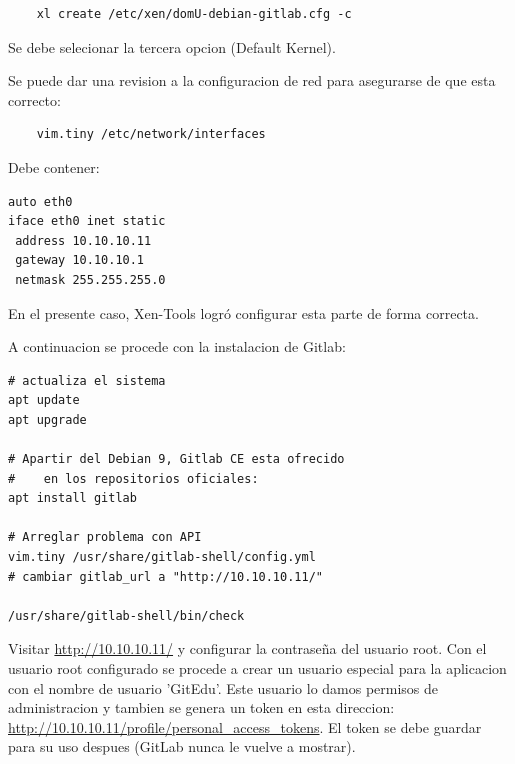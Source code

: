 \begin{lstlisting}
	xl create /etc/xen/domU-debian-gitlab.cfg -c
\end{lstlisting}

Se debe selecionar la tercera opcion (Default Kernel).

Se puede dar una revision a la configuracion de red para asegurarse de que esta correcto:

\begin{lstlisting}
	vim.tiny /etc/network/interfaces
\end{lstlisting}

Debe contener:

\begin{lstlisting}
auto eth0
iface eth0 inet static
 address 10.10.10.11
 gateway 10.10.10.1
 netmask 255.255.255.0
\end{lstlisting}

En el presente caso, Xen-Tools logró configurar esta parte de forma correcta.

A continuacion se procede con la instalacion de Gitlab:

\begin{lstlisting}
# actualiza el sistema
apt update
apt upgrade

# Apartir del Debian 9, Gitlab CE esta ofrecido
#    en los repositorios oficiales:
apt install gitlab

# Arreglar problema con API
vim.tiny /usr/share/gitlab-shell/config.yml
# cambiar gitlab_url a "http://10.10.10.11/"

/usr/share/gitlab-shell/bin/check
\end{lstlisting}

Visitar \url{http://10.10.10.11/} y configurar la contraseña del usuario root. Con el usuario root configurado se procede a crear un usuario especial para la aplicacion con el nombre de usuario 'GitEdu'. Este usuario lo damos permisos de administracion y tambien se genera un token en esta direccion: \url{http://10.10.10.11/profile/personal_access_tokens}. El token se debe guardar para su uso despues (GitLab nunca le vuelve a mostrar).




